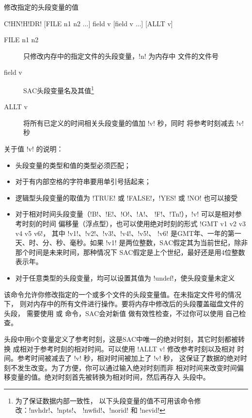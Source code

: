 \label{cmd:chnhdr}

修改指定的头段变量的值

\begin{SACSTX}
C!HN!H!DR! [FILE n1 n2 ...] field v [field v ...] [ALLT v]
\end{SACSTX}

\begin{description}
\item [FILE n1 n2] 只修改内存中的指定文件的头段变量，!n! 为内存中
    文件的文件号
\item [field v] SAC头段变量名及其值\footnote{为了保证数据内部一致性，
    以下头段变量的值不可用该命令修改：!nvhdr!、!npts!、
    !nwfid!、!norid! 和 !nevid!}
\item [ALLT v] 将所有已定义的时间相关头段变量的值加 !v! 秒，同时
    将参考时刻减去 !v! 秒
\end{description}

关于值 !v! 的说明：
\begin{itemize}
\item 头段变量的类型和值的类型必须匹配；
\item 对于有内部空格的字符串要用单引号括起来；
\item 逻辑型头段变量的取值为 !TRUE! 或 !FALSE!，!YES!
    或 !NO! 也可以接受
\item 对于相对时间头段变量（!B!、!E!、!O!、!A!、
    !F!、!Tn!），!v! 可以是相对参考时刻的时间
    偏移量（浮点型），也可以使用绝对时刻的形式 !GMT v1 v2 v3 v4 v5 v6!，
    其中 !v1!、!v2!、!v3!、!v4!、!v5!、
    !v6! 是GMT年、一年的第一天、时、分、秒、毫秒。如果 !v1!
    是两位整数，SAC假定其为当前世纪，除非那个时间是未来时间，那种情况下
    SAC假定是上个世纪，最好还是用4位整数表示年。
\item 对于任意类型的头段变量，均可以设置其值为 !undef!，使头段变量未定义
\end{itemize}

该命令允许你修改指定的一个或多个文件的头段变量值。在未指定文件号的情况下，
则对内存中的所有文件进行操作。要将内存中修改后的头段覆盖磁盘文件的头段，
需要使用  或  命令，SAC会对新值
做有效性检查，不过你可以使用  自己检查。

头段中用6个变量定义了参考时刻，这是SAC中唯一的绝对时刻，其它时刻都被转换
成相对于参考时刻的相对时间。可以使用 !ALLT v! 修改参考时刻以及相对
时间。参考时间被减去了 !v! 秒，相对时间被加上了 !v! 秒，
这保证了数据的绝对时刻不发生改变。为了方便，你可以通过输入绝对时刻而非
相对时间来改变时间偏移变量的值。绝对时刻首先被转换为相对时间，然后再存入
头段中。

